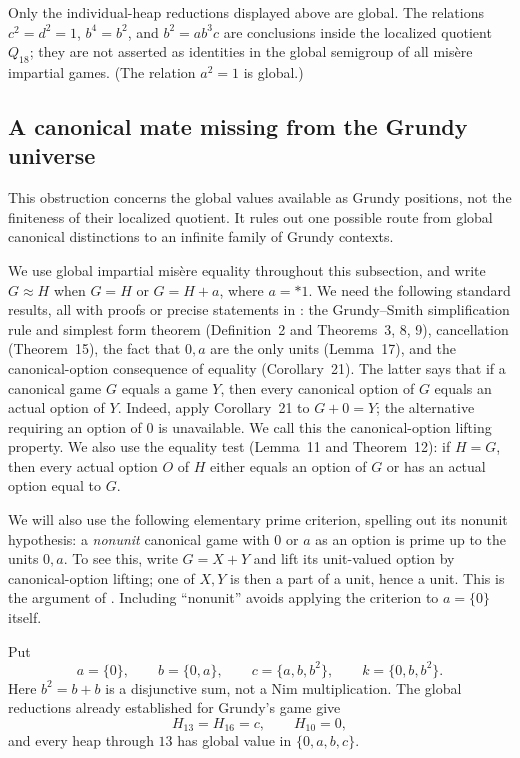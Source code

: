 \documentclass[11pt]{article}
\theoremstyle{definition}
\theoremstyle{remark}
\begin{document}
Only the individual-heap reductions displayed above are global.  The
relations $c^2=d^2=1$, $b^4=b^2$, and $b^2=ab^3c$ are conclusions inside
the localized quotient $Q_{18}$; they are not asserted as identities in the
global semigroup of all mis\`ere impartial games.  (The relation $a^2=1$
is global.)

\subsection{A canonical mate missing from the Grundy universe}

This obstruction concerns the global values available as Grundy positions,
not the finiteness of their localized quotient.  It rules out one possible
route from global canonical distinctions to an infinite family of Grundy
contexts.

We use global impartial mis\`ere equality throughout this subsection, and
write $G\approx H$ when $G=H$ or $G=H+a$, where $a=*1$.  We need the
following standard results, all with proofs or precise statements in
\cite{siegelelements2021}: the Grundy--Smith simplification rule and simplest
form theorem (Definition~2 and Theorems~3, 8, 9), cancellation
(Theorem~15), the fact that $0,a$ are the only units (Lemma~17), and the
canonical-option consequence of equality (Corollary~21).  The latter says that if a canonical game $G$ equals a game $Y$, then
every canonical option of $G$ equals an actual option of $Y$.
Indeed, apply Corollary~21 to $G+0=Y$; the alternative requiring an option
of $0$ is unavailable.  We call this the canonical-option lifting property.
We also use the equality test (Lemma~11 and Theorem~12): if $H=G$, then
every actual option $O$ of $H$ either equals an option of $G$ or has an
actual option equal to $G$.

We will also use the following elementary prime criterion, spelling out
its nonunit hypothesis: a \emph{nonunit} canonical game with $0$ or $a$ as
an option is prime up to the units $0,a$.  To see this, write $G=X+Y$ and
lift its unit-valued option by canonical-option lifting; one of $X,Y$
is then a part of a unit, hence a unit.  This is the argument of
\cite[Proposition~34]{siegelelements2021}.  Including ``nonunit'' avoids
applying the criterion to $a=\{0\}$ itself.

Put
\[
 a=\{0\},\qquad b=\{0,a\},\qquad
 c=\{a,b,b^2\},\qquad k=\{0,b,b^2\}.
\]
Here $b^2=b+b$ is a disjunctive sum, not a Nim multiplication.  The global
reductions already established for Grundy's game give
\[
 H_{13}=H_{16}=c,\qquad H_{10}=0,
\]
and every heap through $13$ has global value in $\{0,a,b,c\}$.
\end{document}
